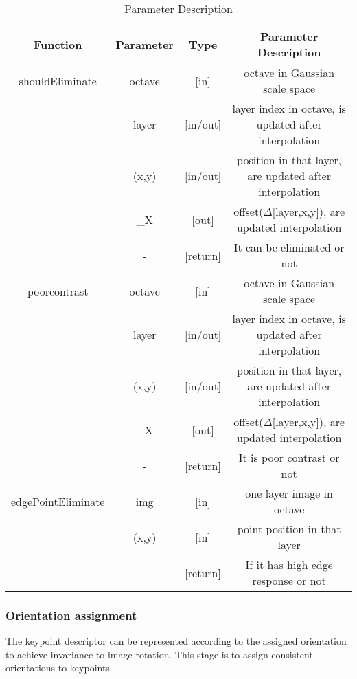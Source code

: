 \documentclass[paper=a4, fontsize=11pt]{scrartcl} %
\numberwithin{equation}{section} %
\numberwithin{figure}{section} %
\numberwithin{table}{section} %
\begin{document}
\begin{table}[h]
    \centering
    \begin{tabular}{|c|c|c|c|}
        \hline
        \textbf{Function} & \textbf{Parameter} & \textbf{Type} & \textbf{Parameter Description} \\\hline
        shouldEliminate & octave & [in] & octave in Gaussian scale space \\
                        & layer & [in/out] & layer index in octave, is updated after interpolation \\
                        & (x,y) & [in/out] & position in that layer, are updated after interpolation \\
                        & \_X & [out] & offset($\Delta$[layer,x,y]), are updated interpolation\\\hline
                        & - & [return] & It can be eliminated or not \\\hline
        poorcontrast & octave & [in] & octave in Gaussian scale space \\
                        & layer & [in/out] & layer index in octave, is updated after interpolation \\
                        & (x,y) & [in/out] & position in that layer, are updated after interpolation \\
                        & \_X & [out] & offset($\Delta$[layer,x,y]), are updated interpolation\\\hline
                        & - & [return] & It is poor contrast or not \\\hline
        edgePointEliminate & img & [in] & one layer image in octave \\
                  & (x,y) & [in] & point position in that layer \\
                        & - &[return] & If it has high edge response or not \\\hline
    \end{tabular}
    \caption{Parameter Description}\label{nolock}
\end{table}

\subsubsection{Orientation assignment}

The keypoint descriptor can be represented according to the assigned orientation to achieve invariance to image rotation. This stage is to assign consistent orientations to keypoints.
\end{document}
